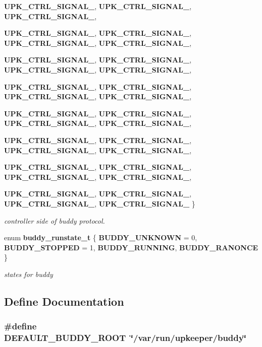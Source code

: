\begin{DoxyCompactItemize}
{\bf UPK\_\-CTRL\_\-SIGNAL\_}, 
{\bf UPK\_\-CTRL\_\-SIGNAL\_}, 
{\bf UPK\_\-CTRL\_\-SIGNAL\_}, 
\par
{\bf UPK\_\-CTRL\_\-SIGNAL\_}, 
{\bf UPK\_\-CTRL\_\-SIGNAL\_}, 
{\bf UPK\_\-CTRL\_\-SIGNAL\_}, 
{\bf UPK\_\-CTRL\_\-SIGNAL\_}, 
\par
{\bf UPK\_\-CTRL\_\-SIGNAL\_}, 
{\bf UPK\_\-CTRL\_\-SIGNAL\_}, 
{\bf UPK\_\-CTRL\_\-SIGNAL\_}, 
{\bf UPK\_\-CTRL\_\-SIGNAL\_}, 
\par
{\bf UPK\_\-CTRL\_\-SIGNAL\_}, 
{\bf UPK\_\-CTRL\_\-SIGNAL\_}, 
{\bf UPK\_\-CTRL\_\-SIGNAL\_}, 
{\bf UPK\_\-CTRL\_\-SIGNAL\_}, 
\par
{\bf UPK\_\-CTRL\_\-SIGNAL\_}, 
{\bf UPK\_\-CTRL\_\-SIGNAL\_}, 
{\bf UPK\_\-CTRL\_\-SIGNAL\_}, 
{\bf UPK\_\-CTRL\_\-SIGNAL\_}, 
\par
{\bf UPK\_\-CTRL\_\-SIGNAL\_}, 
{\bf UPK\_\-CTRL\_\-SIGNAL\_}, 
{\bf UPK\_\-CTRL\_\-SIGNAL\_}, 
{\bf UPK\_\-CTRL\_\-SIGNAL\_}, 
\par
{\bf UPK\_\-CTRL\_\-SIGNAL\_}, 
{\bf UPK\_\-CTRL\_\-SIGNAL\_}, 
{\bf UPK\_\-CTRL\_\-SIGNAL\_}, 
{\bf UPK\_\-CTRL\_\-SIGNAL\_}, 
\par
{\bf UPK\_\-CTRL\_\-SIGNAL\_}, 
{\bf UPK\_\-CTRL\_\-SIGNAL\_}, 
{\bf UPK\_\-CTRL\_\-SIGNAL\_}, 
{\bf UPK\_\-CTRL\_\-SIGNAL\_}
 \}
\begin{DoxyCompactList}\small\item\em controller side of buddy protocol. \end{DoxyCompactList}\item 
enum {\bf buddy\_\-runstate\_\-t} \{ {\bf BUDDY\_\-UNKNOWN} =  0, 
{\bf BUDDY\_\-STOPPED} =  1, 
{\bf BUDDY\_\-RUNNING}, 
{\bf BUDDY\_\-RANONCE}
 \}
\begin{DoxyCompactList}\small\item\em states for buddy \end{DoxyCompactList}\end{DoxyCompactItemize}


\subsection{Define Documentation}
\subsubsection[{DEFAULT\_\-BUDDY\_\-ROOT}]{\setlength{\rightskip}{0pt plus 5cm}\#define DEFAULT\_\-BUDDY\_\-ROOT~\char`\"{}/var/run/upkeeper/buddy\char`\"{}}\label{group__controller_gadf9d49ebd81d139698cb46d0c68bbaa7}


